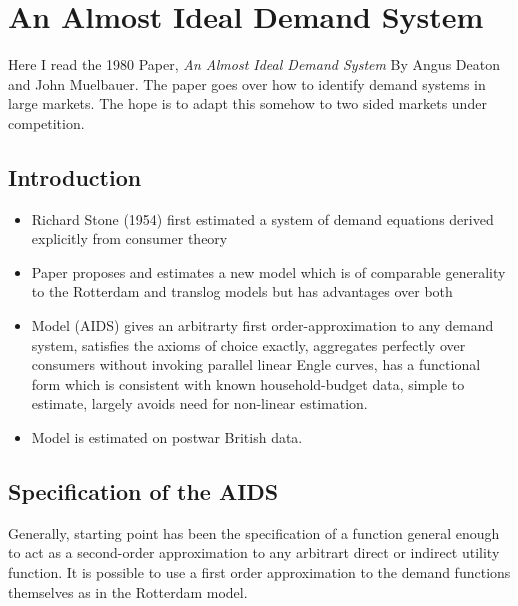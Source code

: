 
\section{An Almost Ideal Demand System}

Here I read the 1980 Paper, \emph{An Almost Ideal Demand System} By Angus Deaton and John Muelbauer. The paper goes over how to identify demand systems in large markets. The hope is to adapt this somehow to two sided markets under competition.

\subsection{Introduction}
\begin{itemize}
	\item Richard Stone (1954) first estimated a system of demand equations derived explicitly from consumer theory
	\item Paper proposes and estimates a new model which is of comparable generality to the Rotterdam and translog models but has advantages over both
	\item Model (AIDS) gives an arbitrarty first order-approximation to any demand system, satisfies the axioms of choice exactly, aggregates perfectly over consumers without invoking parallel linear Engle curves, has a functional form which is consistent with known household-budget data, simple to estimate, largely avoids need for non-linear estimation.
	\item Model is estimated on postwar British data.
\end{itemize}

\subsection{Specification of the AIDS}

Generally, starting point has been the specification of a function general enough to act as a second-order approximation to any arbitrart direct or indirect utility function. It is possible to use a first order approximation to the demand functions themselves as in the Rotterdam model. 

